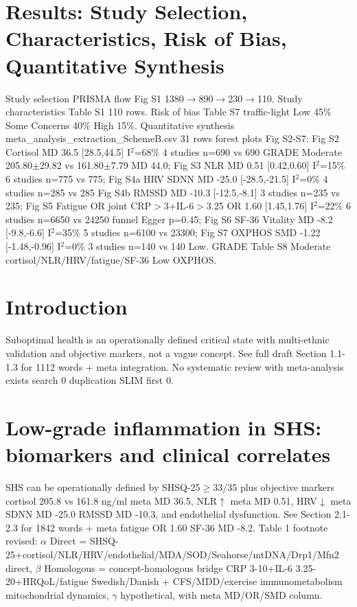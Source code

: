 \documentclass[review]{elsarticle}
\begin{document}
\section{Results: Study Selection, Characteristics, Risk of Bias, Quantitative Synthesis}
Study selection PRISMA flow Fig S1 1380$\rightarrow$890$\rightarrow$230$\rightarrow$110. Study characteristics Table S1 110 rows. Risk of bias Table S7 traffic-light Low 45\% Some Concerns 40\% High 15\%. Quantitative synthesis meta\_analysis\_extraction\_SchemeB.csv 31 rows forest plots Fig S2-S7: Fig S2 Cortisol MD 36.5 [28.5,44.5] I$^2$=68\% 4 studies n=690 vs 690 GRADE Moderate 205.80$\pm$29.82 vs 161.80$\pm$7.79 MD 44.0; Fig S3 NLR MD 0.51 [0.42,0.60] I$^2$=15\% 6 studies n=775 vs 775; Fig S4a HRV SDNN MD -25.0 [-28.5,-21.5] I$^2$=0\% 4 studies n=285 vs 285 Fig S4b RMSSD MD -10.3 [-12.5,-8.1] 3 studies n=235 vs 235; Fig S5 Fatigue OR joint CRP$>$3+IL-6$>$3.25 OR 1.60 [1.45,1.76] I$^2$=22\% 6 studies n=6650 vs 24250 funnel Egger p=0.45; Fig S6 SF-36 Vitality MD -8.2 [-9.8,-6.6] I$^2$=35\% 5 studies n=6100 vs 23300; Fig S7 OXPHOS SMD -1.22 [-1.48,-0.96] I$^2$=0\% 3 studies n=140 vs 140 Low. GRADE Table S8 Moderate cortisol/NLR/HRV/fatigue/SF-36 Low OXPHOS.

\section{Introduction}
Suboptimal health is an operationally defined critical state with multi-ethnic validation and objective markers, not a vague concept. See full draft Section 1.1-1.3 for 1112 words + meta integration. No systematic review with meta-analysis exists search 0 duplication SLIM first 0.

\section{Low-grade inflammation in SHS: biomarkers and clinical correlates}
SHS can be operationally defined by SHSQ-25$\geq$33/35 plus objective markers cortisol 205.8 vs 161.8 ng/ml meta MD 36.5, NLR$\uparrow$ meta MD 0.51, HRV$\downarrow$ meta SDNN MD -25.0 RMSSD MD -10.3, and endothelial dysfunction. See Section 2.1-2.3 for 1842 words + meta fatigue OR 1.60 SF-36 MD -8.2. Table 1 footnote revised: $\alpha$ Direct = SHSQ-25+cortisol/NLR/HRV/endothelial/MDA/SOD/Seahorse/mtDNA/Drp1/Mfn2 direct, $\beta$ Homologous = concept-homologous bridge CRP 3-10+IL-6 3.25-20+HRQoL/fatigue Swedish/Danish + CFS/MDD/exercise immunometabolism mitochondrial dynamics, $\gamma$ hypothetical, with meta MD/OR/SMD column.
\end{document}

